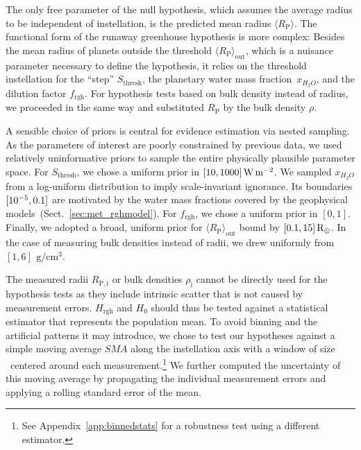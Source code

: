 \documentclass[twocolumn,twocolappendix]{aastex631}
\begin{document}
The only free parameter of the null hypothesis, which assumes the average radius to be independent of instellation, is the predicted mean radius $\langle R_\mathrm{P}\rangle $.
The functional form of the runaway greenhouse hypothesis is more complex: Besides the mean radius of planets outside the threshold $\langle R_\mathrm{P}\rangle_\mathrm{out}$, which is a nuisance parameter necessary to define the hypothesis, it relies on the threshold instellation for the ``step'' $S_\mathrm{thresh}$, the planetary water mass fraction~$x_{H_2O}$, and the dilution factor $f_\mathrm{rgh}$.
For hypothesis tests based on bulk density instead of radius, we proceeded in the same way and substituted $R_\mathrm{P}$ by the bulk density $\rho$.

A sensible choice of priors is central for evidence estimation via nested sampling.
As the parameters of interest are poorly constrained by previous data, we used relatively uninformative priors to sample the entire physically plausible parameter space.
For $S_\mathrm{thresh}$, we chose a uniform prior in $[10,1000]\, \SI{}{\watt\per\meter\squared}$.
We sampled $x_{H_2O}$ from a log-uniform distribution to imply scale-invariant ignorance.
Its boundaries $[10^{-5}, 0.1]$ are motivated by the water mass fractions covered by the geophysical models~(Sect.~\ref{sec:met_rghmodel}).
For $f_\mathrm{rgh}$, we chose a uniform prior in $[0, 1]$.
Finally, we adopted a broad, uniform prior for $\langle R_\mathrm{P}\rangle_\mathrm{out}$ bound by $[0.1, 15] \, \mathrm{R_\oplus}$.
In the case of measuring bulk densities instead of radii, we drew uniformly from $[1, 6] \, \SI{}{\gram\per\centi\meter\cubed}$.

The measured radii $R_\mathrm{P, i}$ or bulk densities $\rho_\mathrm{i}$ cannot be directly used for the hypothesis tests as they include intrinsic scatter that is not caused by measurement errors.
$H_{\mathrm{rgh}}$ and $H_0$ should thus be tested against a statistical estimator that represents the population mean.
To avoid binning and the artificial patterns it may introduce, we chose to test our hypotheses against a simple moving average $SMA$ along the instellation axis with a window of size \windowsize\ centered around each measurement.\footnote{See Appendix~\ref{app:binnedstats} for a robustness test using a different estimator.}
We further computed the uncertainty of this moving average by propagating the individual measurement errors and applying a rolling standard error of the mean. %
\end{document}
